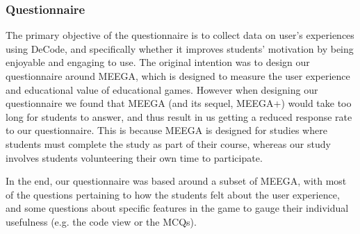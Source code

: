 \documentclass[11pt]{article}
\begin{document}
\subsubsection{Questionnaire}
The primary objective of the questionnaire is to collect data on user's experiences using DeCode, and specifically whether it improves students' motivation by being enjoyable and engaging to use. The original intention was to design our questionnaire around MEEGA\cite{Rafael}\cite{meegaPlus}, which is designed to measure the user experience and educational value of educational games. However when designing our questionnaire we found that MEEGA (and its sequel, MEEGA+) would take too long for students to answer, and thus result in us getting a reduced response rate to our questionnaire. This is because MEEGA is designed for studies where students must complete the study as part of their course, whereas our study involves students volunteering their own time to participate.\par
In the end, our questionnaire was based around a subset of MEEGA, with most of the questions pertaining to how the students felt about the user experience, and some questions about specific features in the game to gauge their individual usefulness (e.g. the code view or the MCQs).
\end{document}
